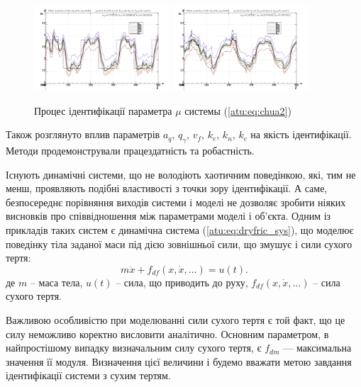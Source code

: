 \documentclass[a4paper,13pt]{atuaref}
\begin{document}
\begin{figure}[htb!]
\centerline{
  \includegraphics[width=0.45\textwidth]{p5/p/cha/chua/chua_m5p-pl_n_sign.png}
  \includegraphics[width=0.45\textwidth]{p5/p/cha/chua/chua_m5p-pl_n_sin.png}
}
\caption{Процес ідентифікації параметра $\mu$ системы (\ref{atu:eq:chua2})
}
\label{atu:f:chua_id}
\end{figure}

Також розглянуто вплив параметрів $a_q$, $q_\gamma$, $v_f$, $k_e$, $k_n$, $k_c$
на якість ідентифікації. Методи
продемонстрували працездатність та робастність.


Існують динамічні системи, що не володіють хаотичним поведінкою, які, тим не
менш, проявляють подібні властивості з точки зору ідентифікації. А саме,
безпосереднє порівняння виходів системи і моделі не дозволяє зробити ніяких
висновків про співвідношення між параметрами моделі і об'єкта. Одним із
прикладів таких систем є динамічна система (\ref{atu:eq:dryfric_sys}), що
моделює поведінку тіла заданої маси під дією зовнішньої сили, що змушує і сили
сухого тертя: %
%
\begin{equation}
  m \ddot{x} + f_{df}( x, \dot{x}, \ldots)  = u(t).
\label{atu:eq:dryfric_sys}
\end{equation}
%
де
$m$ -- маса тела,
$u(t)$ -- сила, що приводить до руху,
$ f_{df}( x, \dot{x}, \ldots)  $ -- сила сухого тертя.

Важливою особливістю при моделюванні сили сухого тертя є той факт, що це силу
неможливо коректно висловити аналітично. Основним параметром, в найпростішому
випадку визначальним силу сухого тертя, є $f_{dm} $ --- максимальна значення її
модуля. Визначення цієї величини і будемо вважати метою завдання ідентифікації
системи з сухим тертям.
\end{document}
